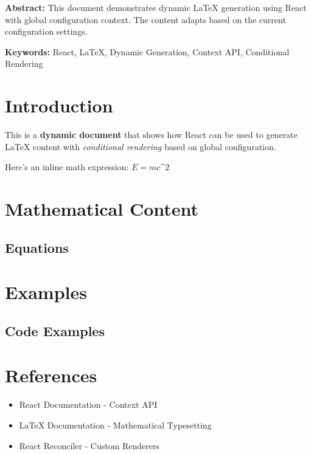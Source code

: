 \documentclass{article}
\begin{document}
\textbf{Abstract:} This document demonstrates dynamic LaTeX generation using React with global configuration context. The content adapts based on the current configuration settings.

\textbf{Keywords:} React, LaTeX, Dynamic Generation, Context API, Conditional Rendering

\section{Introduction}
This is a \textbf{dynamic document} that shows how React can be used to generate LaTeX content with \textit{conditional rendering} based on global configuration.

Here's an inline math expression: $E = mc\^{}2$



\section{Mathematical Content}
\subsection{Equations}



\section{Examples}
\subsection{Code Examples}



\section{References}
\begin{itemize}
\item React Documentation - Context API
\item LaTeX Documentation - Mathematical Typesetting
\item React Reconciler - Custom Renderers
\end{itemize}
\end{document}
